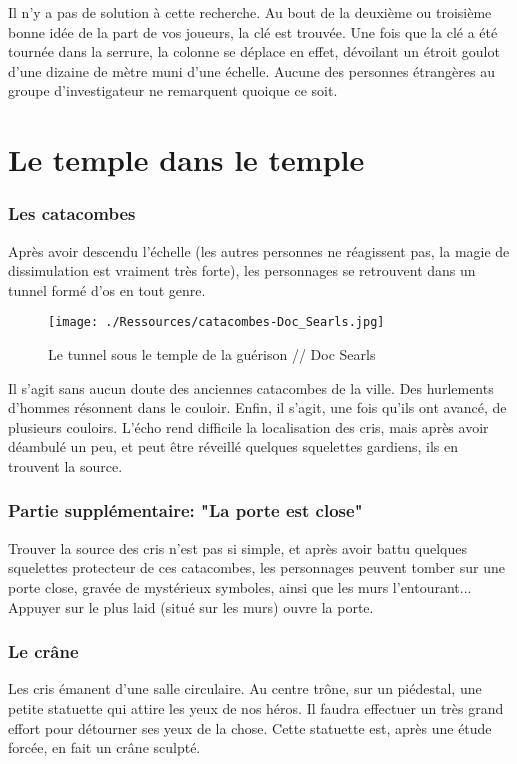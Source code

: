 \documentclass[a4paper, 11pt]{article}
\begin{document}
Il n'y a pas de solution à cette recherche. Au bout de la deuxième ou troisième bonne idée de la part de vos joueurs, la clé est trouvée.
\newline
Une fois que la clé a été tournée dans la serrure, la colonne se déplace en effet, dévoilant un étroit goulot d'une dizaine de mètre muni d'une échelle. Aucune des personnes étrangères au groupe d'investigateur ne remarquent quoique ce soit.

\section{Le temple dans le temple} 
\subsubsection{Les catacombes}
Après avoir descendu l'échelle (les autres personnes ne réagissent pas, la magie de dissimulation est vraiment très forte), les personnages se retrouvent dans un tunnel formé d'os en tout genre.

\begin{figure}[ht]
\begin{center}
\hypertarget{catacombes}{}
\texttt{[image: ./Ressources/catacombes-Doc\_Searls.jpg]}
\caption{Le tunnel sous le temple de la guérison // Doc Searls }
\end{center}
\end{figure}

Il s'agit sans aucun doute des anciennes catacombes de la ville. Des hurlements d'hommes résonnent dans le couloir. Enfin, il s'agit, une fois qu'ils ont avancé, de plusieurs couloirs. L'écho rend difficile la localisation des cris, mais après avoir déambulé un peu, et peut être réveillé quelques squelettes gardiens, ils en trouvent la source.

\subsubsection{Partie supplémentaire: "La porte est close"}
Trouver la source des cris n'est pas si simple, et après avoir battu quelques squelettes protecteur de ces catacombes, les personnages peuvent tomber sur une porte close, gravée de mystérieux symboles, ainsi que les murs l'entourant... Appuyer sur le plus laid (situé sur les murs) ouvre la porte.

\subsubsection{Le crâne}
Les cris émanent d'une salle circulaire. Au centre trône, sur un piédestal, une petite statuette qui attire les yeux de nos héros. Il faudra effectuer un très grand effort pour détourner ses yeux de la chose. Cette statuette est, après une étude forcée, en fait un crâne sculpté.
\end{document}
